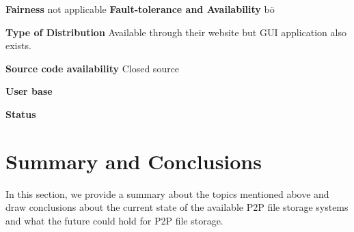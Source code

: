 \textbf{Fairness}
not applicable
\textbf{Fault-tolerance and Availability}
bö

\textbf{Type of Distribution}
Available through their website but GUI application also exists.

\textbf{Source code availability}
Closed source

\textbf{User base}

\textbf{Status}

\section{Summary and Conclusions}
In this section, we provide a summary about the topics mentioned above and draw conclusions about the current state of the available P2P file storage systems and what the future could hold for P2P file storage.

